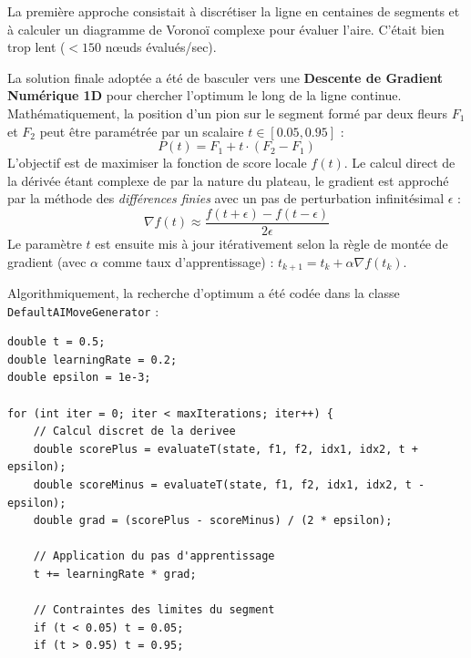 \documentclass[12pt, a4paper]{article}
\begin{document}
\begin{solutionbox}
La première approche consistait à discrétiser la ligne en centaines de segments et à calculer un diagramme de Voronoï complexe pour évaluer l'aire. C'était bien trop lent ($< 150$ nœuds évalués/sec).

La solution finale adoptée a été de basculer vers une \textbf{Descente de Gradient Numérique 1D} pour chercher l'optimum le long de la ligne continue.
Mathématiquement, la position d'un pion sur le segment formé par deux fleurs $F_1$ et $F_2$ peut être paramétrée par un scalaire $t \in [0.05, 0.95]$ :
\begin{equation}
P(t) = F_1 + t \cdot (F_2 - F_1)
\end{equation}
L'objectif est de maximiser la fonction de score locale $f(t)$. Le calcul direct de la dérivée étant complexe de par la nature du plateau, le gradient est approché par la méthode des \textit{différences finies} avec un pas de perturbation infinitésimal $\epsilon$ :
\begin{equation}
\nabla f(t) \approx \frac{f(t + \epsilon) - f(t - \epsilon)}{2\epsilon}
\end{equation}
Le paramètre $t$ est ensuite mis à jour itérativement selon la règle de montée de gradient (avec $\alpha$ comme taux d'apprentissage) : $t_{k+1} = t_k + \alpha \nabla f(t_k)$.

Algorithmiquement, la recherche d'optimum a été codée dans la classe \texttt{DefaultAIMoveGenerator} :
\begin{lstlisting}[caption={Convergence par Descente de Gradient}]
double t = 0.5;
double learningRate = 0.2;
double epsilon = 1e-3;

for (int iter = 0; iter < maxIterations; iter++) {
    // Calcul discret de la derivee
    double scorePlus = evaluateT(state, f1, f2, idx1, idx2, t + epsilon);
    double scoreMinus = evaluateT(state, f1, f2, idx1, idx2, t - epsilon);
    double grad = (scorePlus - scoreMinus) / (2 * epsilon);
    
    // Application du pas d'apprentissage
    t += learningRate * grad;
    
    // Contraintes des limites du segment
    if (t < 0.05) t = 0.05;
    if (t > 0.95) t = 0.95;
    

\end{lstlisting}
\end{solutionbox}
\end{document}
